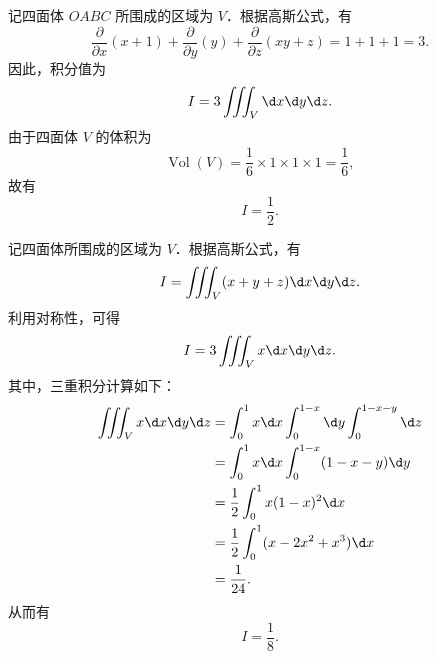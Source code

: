 \begin{solution}

    记四面体 $OABC$ 所围成的区域为 $V$．根据高斯公式，有
    \begin{equation}
        \frac{\partial}{\partial x}(x+1) + \frac{\partial}{\partial y}(y) + \frac{\partial}{\partial z}(xy+z) = 1 + 1 + 1 = 3.
    \end{equation}
    因此，积分值为
    \begin{equation}
        \label{eq:part1-2}
        I = 3 \iiint_V \d x \d y \d z.
    \end{equation}
    由于四面体 $V$ 的体积为
    \begin{equation}
        \label{eq:part1-3}
        \operatorname{Vol}(V) = \frac{1}{6} \times 1 \times 1 \times 1 = \frac{1}{6},
    \end{equation}
    故有
    \begin{equation}
        \label{eq:part1-4}
        I = \boxed{\frac{1}{2}}.
    \end{equation}


    记四面体所围成的区域为 $V$．根据高斯公式，有
    \begin{equation}
        \label{eq:part2-1}
        I = \iiint_V (x + y + z) \d x \d y \d z.
    \end{equation}
    利用对称性，可得
    \begin{equation}
        \label{eq:part2-2}
        I = 3 \iiint_V x \d x \d y \d z.
    \end{equation}
    其中，三重积分计算如下：
    \begin{equation}
        \label{eq:part2-3}
        \begin{aligned}
            \iiint_V x \d x \d y \d z & = \int_0^1 x \d x \int_0^{1-x} \d y \int_0^{1-x-y} \d z \\
                                      & = \int_0^1 x \d x \int_0^{1-x} (1 - x - y) \d y         \\
                                      & = \frac{1}{2} \int_0^1 x (1 - x)^2 \d x                 \\
                                      & = \frac{1}{2} \int_0^1 (x - 2x^2 + x^3) \d x            \\
                                      & = \frac{1}{24}.
        \end{aligned}
    \end{equation}
    从而有
    \begin{equation}
        \label{eq:part2-4}
        I = \boxed{\frac{1}{8}}.
    \end{equation}


\end{solution}
